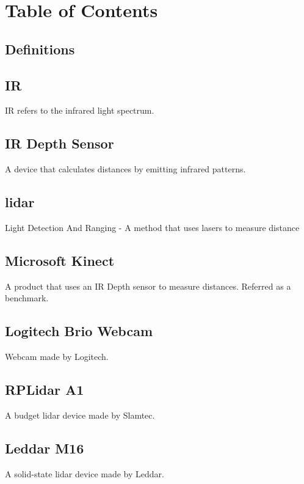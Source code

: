 \documentclass[onecolumn, draftclsnofoot,10pt, compsoc]{IEEEtran}
\begin{document}
\section{Table of Contents}
\tableofcontents


\clearpage

\begin{singlespace}
	\section{Definitions}
		\subsection{IR}\label{def:IR}
		IR refers to the infrared light spectrum.

		\subsection{IR Depth Sensor}\label{def:depthsensor}
		A device that calculates distances by emitting infrared patterns. 
		
		\subsection{lidar}\label{def:lidar}
		Light Detection And Ranging - A method that uses lasers to measure distance
		
		\subsection{Microsoft Kinect}\label{def:kinect}
		A product that uses an IR Depth sensor to measure distances.
		Referred as a benchmark.
		
		\subsection{Logitech Brio Webcam}\label{def:brio}
		Webcam made by Logitech. \cite{logitech}
		
		\subsection{RPLidar A1}\label{def:rplidar}
		A budget lidar device made by Slamtec. \cite{slamtec}

		\subsection{Leddar M16}\label{def:m16}
		A solid-state lidar device made by Leddar. \cite{Leddartech}


\end{singlespace}
\end{document}

